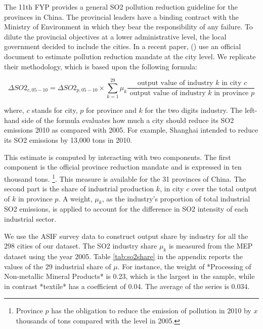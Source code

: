 \documentclass[12pt]{article}
\begin{document}
The 11th FYP provides a general SO2 pollution reduction guideline for the provinces in China. The provincial leaders have a binding contract with the Ministry of Environment in which they bear the responsibility of any failure. To dilute the provincial objectives at a lower administrative level, the local government decided to include the cities. In a recent paper, (\cite{Chen2018-ki}) use an official document to estimate pollution reduction mandate at the city level. We replicate their methodology, which is based upon the following formula:

\begin{equation}
\Delta SO2_{c, 05 - 10}=\Delta SO2_{p, 05 - 10} \times \sum_{k=1}^{29} \mu_{k} \frac{\text { output value of industry } k \text { in city } c}{\text { output value of industry } k \text { in province } p}
\end{equation}

where, $c$ stands for city, $p$ for province and $k$ for the two digits industry. The left-hand side of the formula evaluates how much a city should reduce its SO2 emissions 2010 as compared with 2005. For example, Shanghai intended to reduce its SO2 emissions by 13,000 tons in 2010.

This estimate is computed by interacting with two components. The first component is the official province reduction mandate and is expressed in ten thousand tons. \footnote{Province $p$ has the obligation to reduce the emission of pollution in 2010 by $x$ thousands of tons compared with the level in 2005.}. This measure is available for the 31 provinces of China. The second part is the share of industrial production $k$, in city $c$ over the total output of $k$ in province $p$. A weight, $\mu_k$, as the industry's proportion of total industrial SO2 emissions, is applied to account for the difference in SO2 intensity of each industrial sector.

We use the ASIF survey data to construct output share by industry for all the 298 cities of our dataset. The SO2 industry share $\mu_k$  is measured from the MEP dataset using the year 2005. Table \ref{tab:so2share} in the appendix reports the values of the 29 industrial share of $\mu$. For instance, the weight of *Processing of Non-metallic Mineral Products* is 0.23, which is the largest in the sample, while in contrast *textile* has a coefficient of  0.04. The average of the series is 0.034.
\end{document}
